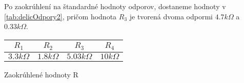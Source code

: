 \begin{multicols*}{2}
\begin{tablehere}
	 		\vskip 0.1cm
		 \end{tablehere}
	     \noindent Po zaokrúhlení na štandardné hodnoty odporov, dostaneme hodnoty v \cref{tab:delicOdpory2}, pričom hodnota $R_3$ je tvorená dvoma odpormi $4.7k\Omega$ a $0.33k\Omega$.
	      \vskip 0.1cm
		 \begin{tablehere}
		 	\centering
		 	\begin{tabular}{cccc}
		 		$R_1$ & $R_2$ & $R_3$ & $R_4$ \\
		 		\hline
		 		$3.3k\Omega$ & $1.8k\Omega$ & $5.03k\Omega$ & $10k\Omega$ \\
		 	\end{tabular}
		 	\caption{Zaokrúhlené hodnoty R} \label{tab:delicOdpory2}
		 \end{tablehere}
	\end{multicols*}

	
